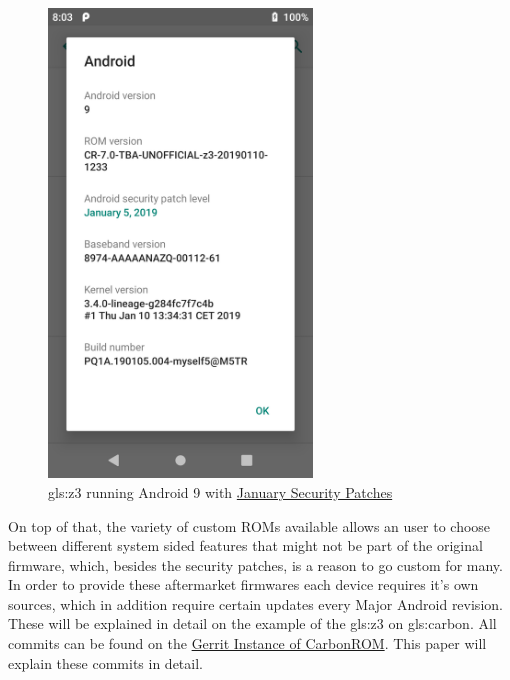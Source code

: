 \begin{figure}
\centering
\includegraphics[width=7cm]{images/z3_january_asb}
\caption{\gls{gls:z3} running Android 9 with \hyperref[jan_asb]{January Security Patches}}
\label{fig:z3_january_asb}
\end{figure}

On top of that, the variety of custom ROMs available allows an user to choose between different system sided features that might not be part of the original firmware, which, besides the security patches, is a reason to go custom for many.
In order to provide these aftermarket firmwares each device requires it's own sources, which in addition require certain updates every Major Android revision. These will be explained in detail on the example of the \gls{gls:z3} on \gls{gls:carbon}. All commits can be found on the \href{https://review.carbonrom.org/q/topic:%22shinano_pie%22+(status:open%20OR%20status:merged)}{Gerrit Instance of CarbonROM}. This paper will explain these commits in detail.
